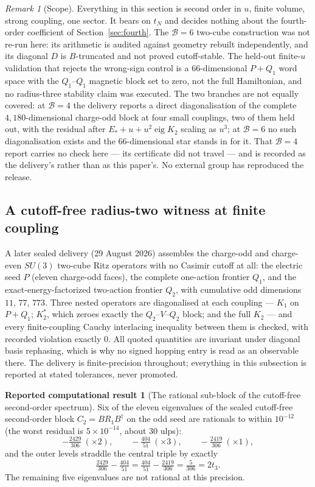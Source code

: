 \documentclass[11pt]{article}
\theoremstyle{plain}
\theoremstyle{definition}
\newtheorem{reported}[theorem]{Reported computational result}
\theoremstyle{remark}
\newtheorem{remark}[theorem]{Remark}
\newcommand{\dg}{^{\dagger}}
\begin{document}
\begin{remark}[Scope]
Everything in this section is second order in $u$, finite volume, strong
coupling, one sector. It bears on $t_N$ and decides nothing about the
fourth-order coefficient of Section~\ref{sec:fourth}. The
$\mathcal B=6$ two-cube construction was not re-run here: its arithmetic is
audited against geometry rebuilt independently, and its diagonal $D$ is
$B$-truncated and not proved cutoff-stable. The held-out finite-$u$ validation
that rejects the wrong-sign control is a $66$-dimensional $P+Q_1$ word space
with the $Q_1$--$Q_1$ magnetic block set to zero, not the full Hamiltonian, and
no radius-three stability claim was executed. The two branches are not equally
covered: at $\mathcal B=4$ the delivery reports a direct diagonalisation of the complete
$4{,}180$-dimensional charge-odd block at four small couplings, two of them
held out, with the residual after $E_*+u+u^2\operatorname{eig}K_2$ scaling as
$u^3$; at $\mathcal B=6$ no such diagonalisation exists and the $66$-dimensional star
stands in for it. That $\mathcal B=4$ report carries no check here --- its certificate
did not travel --- and is recorded as the delivery's rather than as this
paper's. No external group has reproduced the release.
\end{remark}

\subsection{A cutoff-free radius-two witness at finite coupling}
\label{sec:radius2}

A later sealed delivery (29 August 2026) assembles the charge-odd and
charge-even $SU(3)$ two-cube Ritz operators with no Casimir cutoff at all:
the electric seed $P$ (eleven charge-odd faces), the complete one-action
frontier $Q_1$, and the exact-energy-factorized two-action frontier $Q_2$,
with cumulative odd dimensions $11$, $77$, $773$. Three nested operators are
diagonalised at each coupling --- $K_1$ on $P+Q_1$; $K_2^{\ast}$, which zeroes
exactly the $Q_2$--$V$--$Q_2$ block; and the full $K_2$ --- and every
finite-coupling Cauchy interlacing inequality between them is checked, with
recorded violation exactly $0$. All quoted quantities are invariant under
diagonal basis rephasing, which is why no signed hopping entry is read as an
observable there. The delivery is finite-precision throughout; everything in
this subsection is reported at stated tolerances, never promoted.

\begin{reported}[The rational sub-block of the cutoff-free second-order
spectrum]\label{rep:radius2}
Six of the eleven eigenvalues of the sealed cutoff-free second-order block
$C_2=BR_1B\dg$ on the odd seed are rationals to within $10^{-12}$
(the worst residual is $5\times10^{-14}$, about $30$ ulps):
\[
  -\tfrac{2429}{306}\ (\times2),\qquad
  -\tfrac{404}{51}\ (\times3),\qquad
  -\tfrac{2419}{306}\ (\times1),
\]
and the outer levels straddle the central triple by exactly
\[
  \tfrac{2429}{306}-\tfrac{404}{51}
  =\tfrac{404}{51}-\tfrac{2419}{306}
  =\tfrac{5}{306}=2t_3 .
\]
The remaining five eigenvalues are not rational at this precision.
\end{reported}
\end{document}
